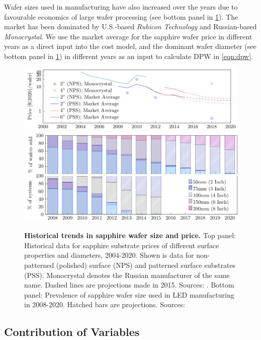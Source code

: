 \documentclass[parskip=full]{article}
\begin{document}
Wafer sizes used in manufacturing have also increased over the years due to favourable economics of large wafer processing (see bottom panel in \cref{fig:wafers}). The market has been dominated by U.S.-based \textit{Rubicon Technology} and Russian-based \textit{Monocrystal}. We use the market average for the sapphire wafer price in different years as a direct input into the cost model, and the dominant wafer diameter (see bottom panel in \cref{fig:wafers}) in different years as an input to calculate DPW in \cref{eqn:dpw}.

\begin{figure}[h!]
    \includegraphics[width=15cm]{./figures/sapphire_prices.pdf}
    \includegraphics[width=14.5cm]{./figures/wafer_size.pdf}
	\caption{\textbf{Historical trends in sapphire wafer size and price.} Top panel: Historical data for sapphire substrate prices of different surface properties and diameters, 2004-2020. Shown is data for non-patterned (polished) surface (NPS) and patterned surface substrates (PSS). Monocrystal denotes the Russian manufacturer of the same name. Dashed lines are projections made in 2015. Sources: \cite{monocrystal2020private}\cite{yole2011sapphire}\cite{yole2015sapphire}. Bottom panel: Prevalence of sapphire wafer size used in LED manufacturing in 2008-2020. Hatched bars are projections. Sources: \cite{veeco2013}\cite{Scholand2012}\cite{yole2015sapphire}}
	\label{fig:wafers}
\end{figure}

\subsection{Contribution of Variables}
\label{sec:contribution_variables}
\end{document}
